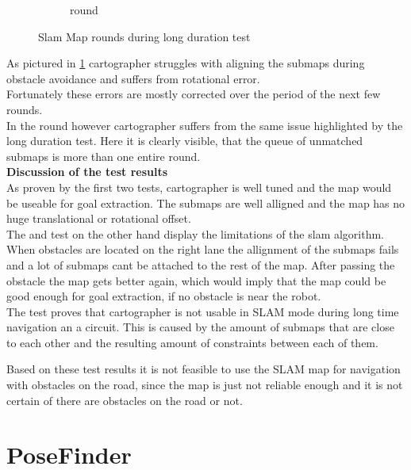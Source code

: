 \begin{figure}[H]
\begin{subfigure}{.3\linewidth}
		\caption{ round}
	\end{subfigure}

	\caption{Slam Map rounds during long duration test}
	\label{4slamtest}

\end{figure}

As pictured in \ref{4slamtest} cartographer struggles with aligning the submaps during obstacle avoidance and suffers from rotational error.\\
Fortunately these errors are mostly corrected over the period of the next few rounds.\\ In the  round however cartographer suffers from the same issue highlighted by the long duration test. Here it is clearly visible, that the queue of unmatched submaps is more than one entire round.\\

\textbf{Discussion of the test results}\\
As proven by the first two tests, cartographer is well tuned and the map would be useable for goal extraction. The submaps are well alligned and the map has no huge translational or rotational offset.\\

The  and  test on the other hand display the limitations of the slam algorithm.\\
When obstacles are located on the right lane the allignment of the submaps fails and a lot of submaps cant be attached to the rest of the map. After passing the obstacle the map gets better again, which would imply that the map could be good enough for goal extraction, if no obstacle is near the robot.\\
The  test proves that cartographer is not usable in SLAM mode during long time navigation an a circuit. This is caused by the amount of submaps that are close to each other and the resulting amount of constraints between each of them.

Based on these test results it is not feasible to use the SLAM map for navigation with obstacles on the road, since the map is just not reliable enough and it is not certain of there are obstacles on the road or not. 

\section{PoseFinder}

